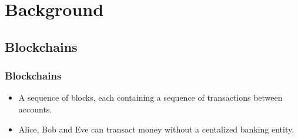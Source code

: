 \documentclass{beamer}
\begin{document}
\section{Background}
\subsection{Blockchains}
\begin{frame}[fragile]
    \frametitle{Blockchains}
  \begin{figure}
    \centering
    \begin{tikzpicture}[shorten >=1pt,on grid, node distance=2.2cm, draw=black!80, auto]
      
    \end{tikzpicture}
  \end{figure}
  \begin{itemize}
    \item A sequence of blocks, each containing a sequence of transactions
      between accounts.
    \item Alice, Bob and Eve can transact money without a centalized
      banking entity.
  \end{itemize}
\end{frame}
\end{document}
